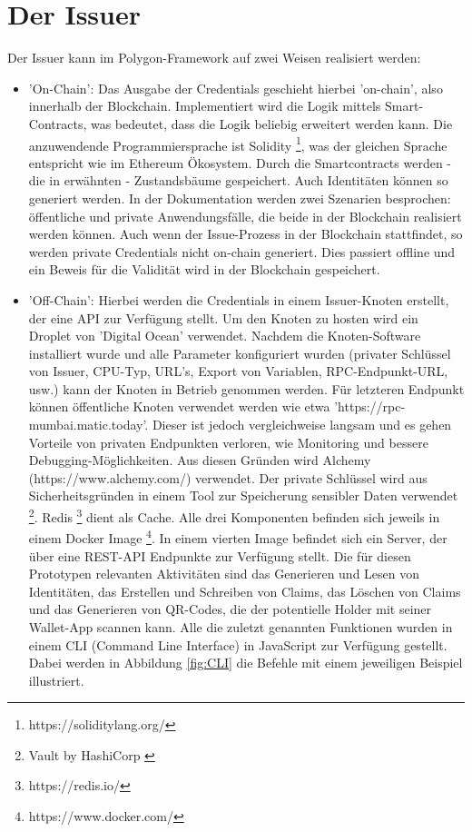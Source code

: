 \section{Der Issuer}
Der Issuer kann im Polygon-Framework auf zwei Weisen realisiert werden:
\begin{itemize}
	\item 'On-Chain': Das Ausgabe der Credentials geschieht hierbei 'on-chain', also innerhalb der Blockchain. Implementiert wird die Logik mittels Smart-Contracts, was bedeutet, dass die Logik beliebig erweitert werden kann. Die anzuwendende Programmiersprache ist Solidity \footnote{https://soliditylang.org/}, was der gleichen Sprache entspricht wie im Ethereum Ökosystem. Durch die Smartcontracts werden - die in  erwähnten - Zustandsbäume gespeichert. Auch Identitäten können so generiert  werden. In der Dokumentation werden zwei Szenarien besprochen: öffentliche und private Anwendungsfälle, die beide in der Blockchain realisiert werden können. Auch wenn der Issue-Prozess in der Blockchain stattfindet, so werden private Credentials nicht on-chain generiert. Dies passiert offline und ein Beweis für die Validität wird in der Blockchain gespeichert.
	\item  'Off-Chain': Hierbei werden die Credentials in einem Issuer-Knoten erstellt, der eine API zur Verfügung stellt. Um den Knoten zu hosten wird ein Droplet von 'Digital Ocean' verwendet. Nachdem die Knoten-Software installiert wurde und alle Parameter konfiguriert wurden (privater Schlüssel von Issuer, CPU-Typ, URL's, Export von Variablen, RPC-Endpunkt-URL, usw.) kann der Knoten in Betrieb genommen werden. Für letzteren Endpunkt können öffentliche Knoten verwendet werden wie etwa 'https://rpc-mumbai.matic.today'. Dieser ist jedoch vergleichweise langsam und es gehen Vorteile von privaten Endpunkten verloren, wie Monitoring und bessere Debugging-Möglichkeiten. Aus diesen Gründen wird Alchemy (https://www.alchemy.com/) verwendet. Der private Schlüssel wird aus Sicherheitsgründen in einem Tool zur Speicherung sensibler Daten verwendet \footnote{Vault by HashiCorp \label{vault}}. Redis \footnote{https://redis.io/} dient als Cache. Alle drei Komponenten befinden sich jeweils in einem Docker Image \footnote{https://www.docker.com/}. In einem vierten Image befindet sich ein Server, der über eine REST-API Endpunkte zur Verfügung stellt. Die für diesen Prototypen relevanten Aktivitäten sind das Generieren und Lesen von Identitäten, das Erstellen und Schreiben von Claims, das Löschen von Claims und das Generieren von QR-Codes, die der potentielle Holder mit seiner Wallet-App scannen kann. Alle die zuletzt genannten Funktionen wurden in einem CLI (Command Line Interface) in JavaScript zur Verfügung gestellt. Dabei werden in Abbildung \ref{fig:CLI} die Befehle mit einem jeweiligen Beispiel illustriert.
	

\end{itemize}
